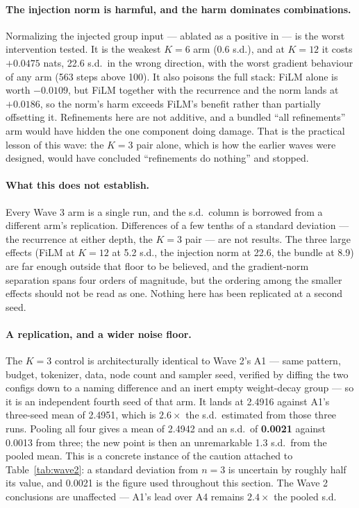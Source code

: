 \documentclass[11pt,a4paper]{article}
\begin{document}
\paragraph{The injection norm is harmful, and the harm dominates combinations.} Normalizing the
injected group input --- ablated as a positive in \cite{parcae} --- is the worst intervention tested.
It is the weakest $K{=}6$ arm (0.6 s.d.), and at $K{=}12$ it costs $+0.0475$ nats, 22.6 s.d.\ in the
wrong direction, with the worst gradient behaviour of any arm (563 steps above 100). It also
poisons the full stack: FiLM alone is worth $-0.0109$, but FiLM together with the recurrence and the
norm lands at $+0.0186$, so the norm's harm exceeds FiLM's benefit rather than partially offsetting
it. Refinements here are not additive, and a bundled ``all refinements'' arm would have hidden the
one component doing damage. That is the practical lesson of this wave: the $K{=}3$ pair alone, which
is how the earlier waves were designed, would have concluded ``refinements do nothing'' and stopped.

\paragraph{What this does not establish.} Every Wave 3 arm is a single run, and the s.d.\ column is
borrowed from a different arm's replication. Differences of a few tenths of a standard deviation ---
the recurrence at either depth, the $K{=}3$ pair --- are not results. The three large effects (FiLM
at $K{=}12$ at 5.2 s.d., the injection norm at 22.6, the bundle at 8.9) are far enough outside that
floor to be believed, and the gradient-norm separation spans four orders of magnitude, but the
ordering among the smaller effects should not be read as one. Nothing here has been replicated at a
second seed.

\paragraph{A replication, and a wider noise floor.} The $K{=}3$ control is architecturally identical
to Wave 2's A1 --- same pattern, budget, tokenizer, data, node count and sampler seed, verified by
diffing the two configs down to a naming difference and an inert empty weight-decay group --- so it
is an independent fourth seed of that arm. It lands at 2.4916 against A1's three-seed mean of
2.4951, which is $2.6\times$ the s.d.\ estimated from those three runs. Pooling all four gives a mean
of 2.4942 and an s.d.\ of \textbf{0.0021} against 0.0013 from three; the new point is then an
unremarkable 1.3 s.d.\ from the pooled mean. This is a concrete instance of the caution attached to
Table~\ref{tab:wave2}: a standard deviation from $n=3$ is uncertain by roughly half its value, and
0.0021 is the figure used throughout this section. The Wave 2 conclusions are unaffected --- A1's
lead over A4 remains $2.4\times$ the pooled s.d.
\end{document}
